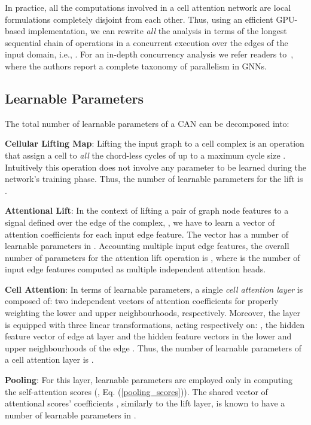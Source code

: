 \documentclass{article}
\begin{document}
In practice, all the computations involved in a cell attention network are local formulations completely disjoint from each other. Thus, using an efficient GPU-based implementation, we can rewrite \emph{all} the analysis in terms of the longest sequential chain of operations in a concurrent execution over the edges of the input domain, i.e., . For an in-depth concurrency analysis we refer readers to~\cite{Besta22parallel}, where the authors report a complete taxonomy of parallelism in GNNs.   

\subsection{Learnable Parameters}

The total number of learnable parameters of a CAN can be decomposed into:

\textbf{Cellular Lifting Map}: Lifting the input graph  to a cell complex  is an operation that assign a cell  to \emph{all} the chord-less cycles of  up to a maximum cycle size . Intuitively this operation does not involve any parameter to be learned during the network's training phase. Thus, the number of learnable parameters for the lift is .

\textbf{Attentional Lift}: In the context of lifting a pair of graph node features  to a signal defined over the edge of the complex, , we have to learn a vector of attention coefficients  for each input edge feature. The vector  has a number of learnable parameters in . Accounting multiple input edge features, the overall number of parameters for the attention lift operation is , where  is the number of input edge features computed as multiple independent attention heads.

\textbf{Cell Attention}: In terms of learnable parameters, a single \emph{cell attention layer} is composed of: two independent vectors of attention coefficients  for properly weighting the lower and upper neighbourhoods, respectively. Moreover, the layer is equipped with three linear transformations,  acting respectively on: , the hidden feature vector of edge  at layer  and the hidden feature vectors  in the lower and upper neighbourhoods of the edge . Thus, the number of learnable parameters of a cell attention layer is .

\textbf{Pooling}: For this layer, learnable parameters are employed only in computing the self-attention scores (, Eq. (\ref{pooling_scores})). The shared vector of attentional scores' coefficients , similarly to the lift layer, is known to have a number of learnable parameters in .
\end{document}
